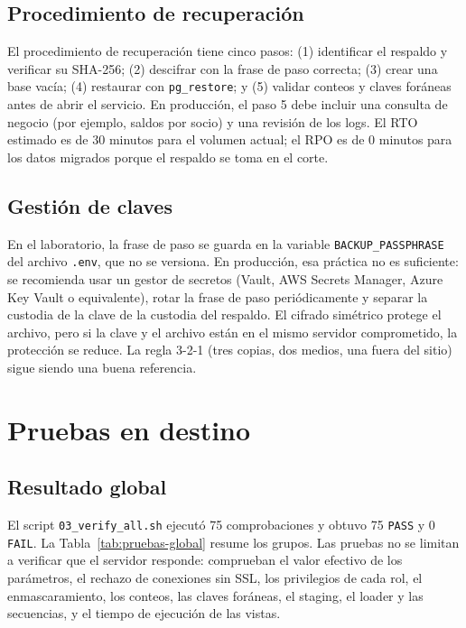 \subsection{Procedimiento de recuperación}

El procedimiento de recuperación tiene cinco pasos: (1) identificar el
respaldo y verificar su SHA-256; (2) descifrar con la frase de paso correcta;
(3) crear una base vacía; (4) restaurar con \texttt{pg\_restore}; y (5)
validar conteos y claves foráneas antes de abrir el servicio. En producción,
el paso 5 debe incluir una consulta de negocio (por ejemplo, saldos por
socio) y una revisión de los logs. El RTO estimado es de 30 minutos para el
volumen actual; el RPO es de 0 minutos para los datos migrados porque el
respaldo se toma en el corte.

\subsection{Gestión de claves}

En el laboratorio, la frase de paso se guarda en la variable
\texttt{BACKUP\_PASSPHRASE} del archivo \texttt{.env}, que no se versiona.
En producción, esa práctica no es suficiente: se recomienda usar un gestor de
secretos (Vault, AWS Secrets Manager, Azure Key Vault o equivalente), rotar la
frase de paso periódicamente y separar la custodia de la clave de la custodia
del respaldo. El cifrado simétrico protege el archivo, pero si la clave y el
archivo están en el mismo servidor comprometido, la protección se reduce. La
regla 3-2-1 (tres copias, dos medios, una fuera del sitio) sigue siendo una
buena referencia.

\section{Pruebas en destino}

\subsection{Resultado global}

El script \texttt{03\_verify\_all.sh} ejecutó 75 comprobaciones y obtuvo
75 \texttt{PASS} y 0 \texttt{FAIL}. La Tabla~\ref{tab:pruebas-global} resume
los grupos. Las pruebas no se limitan a verificar que el servidor responde:
comprueban el valor efectivo de los parámetros, el rechazo de conexiones sin
SSL, los privilegios de cada rol, el enmascaramiento, los conteos, las claves
foráneas, el staging, el loader y las secuencias, y el tiempo de ejecución de
las vistas.

